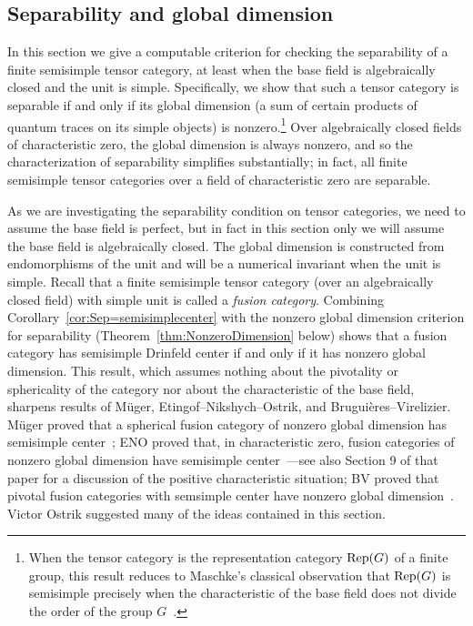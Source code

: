 \documentclass{amsart}
\begin{document}
\subsection{Separability and global dimension} \label{sec:tc-fusion}


In this section we give a computable criterion for checking the separability of a finite semisimple tensor category, at least when the base field is algebraically closed and the unit is simple.  Specifically, we show that such a tensor category is separable if and only if its global dimension (a sum of certain products of quantum traces on its simple objects) is nonzero.\footnote{When the tensor category is the representation category $\mathrm{Rep}(G)$ of a finite group, this result reduces to Maschke's classical observation that $\mathrm{Rep}(G)$ is semisimple precisely when the characteristic of the base field does not divide the order of the group $G$~\cite{maschke}.}  Over algebraically closed fields of characteristic zero, the global dimension is always nonzero, and so the characterization of separability simplifies substantially; in fact, all finite semisimple tensor categories over a field of characteristic zero are separable.

As we are investigating the separability condition on tensor categories, we need to assume the base field is perfect, but in fact in this section only we will assume the base field is algebraically closed.  The global dimension is constructed from endomorphisms of the unit and will be a numerical invariant when the unit is simple.  Recall that a finite semisimple tensor category (over an algebraically closed field) with simple unit is called a \emph{fusion category}.  Combining Corollary~\ref{cor:Sep=semisimplecenter} with the nonzero global dimension criterion for separability (Theorem~\ref{thm:NonzeroDimension} below) shows that a fusion category has semisimple Drinfeld center if and only if it has nonzero global dimension.  This result, which assumes nothing about the pivotality or sphericality of the category nor about the characteristic of the base field, sharpens results of M\"uger, Etingof--Nikshych--Ostrik, and Brugui\`eres--Virelizier.  M\"uger proved that a spherical fusion category of nonzero global dimension has semisimple center~\cite[Thm. 3.16]{MR1966525}; ENO proved that, in characteristic zero, fusion categories of nonzero global dimension have semisimple center~\cite[Thm. 2.15]{MR2183279}---see also Section 9 of that paper for a discussion of the positive characteristic situation; BV proved that pivotal fusion categories with semsimple center have nonzero global dimension~\cite{MR3079759}.  Victor Ostrik suggested many of the ideas contained in this section.
\end{document}
